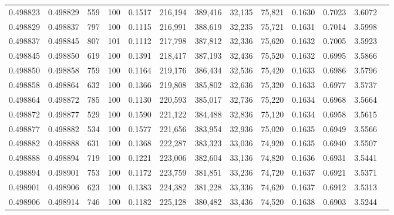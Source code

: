\begin{tabular}{rrrrrrrrrrrrr}
0.498823 & 0.498829 &   559 & 100 &                                     0.1517 & 216,194 & 389,416 &  32,135 &  75,821 & 0.1630 & 0.7023 & 3.6072 \\
0.498829 & 0.498837 &   797 & 100 &                                     0.1115 & 216,991 & 388,619 &  32,235 &  75,721 & 0.1631 & 0.7014 & 3.5998 \\
0.498837 & 0.498845 &   807 & 101 &                                     0.1112 & 217,798 & 387,812 &  32,336 &  75,620 & 0.1632 & 0.7005 & 3.5923 \\
0.498845 & 0.498850 &   619 & 100 &                                     0.1391 & 218,417 & 387,193 &  32,436 &  75,520 & 0.1632 & 0.6995 & 3.5866 \\
0.498850 & 0.498858 &   759 & 100 &                                     0.1164 & 219,176 & 386,434 &  32,536 &  75,420 & 0.1633 & 0.6986 & 3.5796 \\
0.498858 & 0.498864 &   632 & 100 &                                     0.1366 & 219,808 & 385,802 &  32,636 &  75,320 & 0.1633 & 0.6977 & 3.5737 \\
0.498864 & 0.498872 &   785 & 100 &                                     0.1130 & 220,593 & 385,017 &  32,736 &  75,220 & 0.1634 & 0.6968 & 3.5664 \\
0.498872 & 0.498877 &   529 & 100 &                                     0.1590 & 221,122 & 384,488 &  32,836 &  75,120 & 0.1634 & 0.6958 & 3.5615 \\
0.498877 & 0.498882 &   534 & 100 &                                     0.1577 & 221,656 & 383,954 &  32,936 &  75,020 & 0.1635 & 0.6949 & 3.5566 \\
0.498882 & 0.498888 &   631 & 100 &                                     0.1368 & 222,287 & 383,323 &  33,036 &  74,920 & 0.1635 & 0.6940 & 3.5507 \\
0.498888 & 0.498894 &   719 & 100 &                                     0.1221 & 223,006 & 382,604 &  33,136 &  74,820 & 0.1636 & 0.6931 & 3.5441 \\
0.498894 & 0.498901 &   753 & 100 &                                     0.1172 & 223,759 & 381,851 &  33,236 &  74,720 & 0.1637 & 0.6921 & 3.5371 \\
0.498901 & 0.498906 &   623 & 100 &                                     0.1383 & 224,382 & 381,228 &  33,336 &  74,620 & 0.1637 & 0.6912 & 3.5313 \\
0.498906 & 0.498914 &   746 & 100 &                                     0.1182 & 225,128 & 380,482 &  33,436 &  74,520 & 0.1638 & 0.6903 & 3.5244 \\

\end{tabular}
